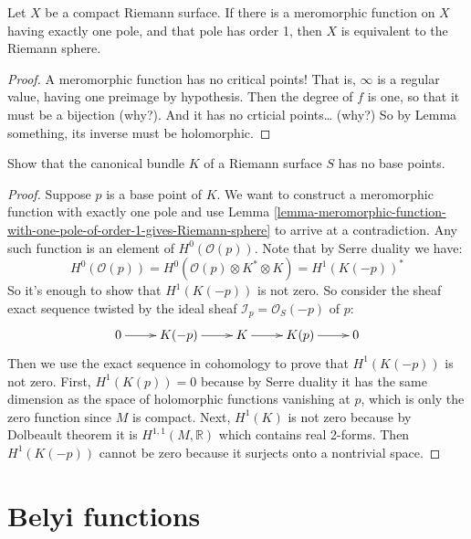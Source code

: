 \begin{lemma}
\label{lemma-meromorphic-function-with-one-pole-of-order-1-gives-Riemann-sphere}
Let $X$ be a compact Riemann surface. If there is a meromorphic function on $X$
having exactly one pole, and that pole has order 1, then $X$ is equivalent to
the Riemann sphere.
\end{lemma}

\begin{proof}
A meromorphic function has no critical points! That is, $\infty$ is a regular
value, having one preimage by hypothesis. Then the degree of $f$ is one, so that
it must be a bijection (why?). And it has no crticial points… (why?) So by Lemma
something, its inverse must be holomorphic.
\end{proof}

\begin{exercise}
\label{exercise-canonical-bundle-of-Riemann-surface-has-no-base-points}
Show that the canonical bundle $K$ of a Riemann surface $S$ has no base points.
\end{exercise}

\begin{proof}
Suppose $p$ is a base point of $K$. We want to construct a meromorphic function
with exactly one pole and use Lemma
\ref{lemma-meromorphic-function-with-one-pole-of-order-1-gives-Riemann-sphere}
to arrive at a contradiction. Any such function is an element of
$H^{0}(\mathcal{O}(p))$. Note that by Serre duality we have:
$$
H^{0}(\mathcal{O}(p))=H^{0}(\mathcal{O}(p)\otimes K^*\otimes K)
=H^{1}(K(-p))^*
$$
So it's enough to show that $H^{1}(K(-p))$ is not zero. So consider the sheaf 
exact sequence twisted by the ideal sheaf $\mathcal{I}_p=\mathcal{O}_S(-p)$ 
of $p$:
$$
\xymatrix{
0\ar[r]&K(-p)\ar[r]&K\ar[r]&K(p)\ar[r]&0
}
$$
Then we use the exact sequence in cohomology to prove that $H^{1}(K(-p))$ is not
zero. First, $H^{1}(K(p))=0$ because by Serre duality it has the same dimension
as the space of holomorphic functions vanishing at $p$, which is only the zero
function since $M$ is compact. Next, $H^{1}(K)$ is not zero because by Dolbeault
theorem it is $H^{1,1}(M,\mathbb{R})$ which contains real 2-forms. Then
$H^{1}(K(-p))$ cannot be zero because it surjects onto a nontrivial space.
\end{proof}

\section{Belyi functions}
\label{section-Belyi-functions}

